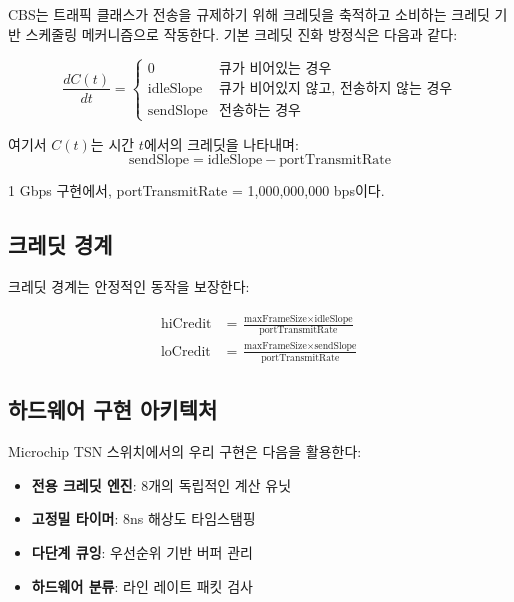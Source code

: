 \documentclass[12pt, a4paper]{article}
\begin{document}
CBS는 트래픽 클래스가 전송을 규제하기 위해 크레딧을 축적하고 소비하는 크레딧 기반 스케줄링 메커니즘으로 작동한다. 기본 크레딧 진화 방정식은 다음과 같다:

\begin{equation}
\frac{dC(t)}{dt} = \begin{cases}
0 & \text{큐가 비어있는 경우} \\
\text{idleSlope} & \text{큐가 비어있지 않고, 전송하지 않는 경우} \\
\text{sendSlope} & \text{전송하는 경우}
\end{cases}
\end{equation}

여기서 $C(t)$는 시간 $t$에서의 크레딧을 나타내며:
\begin{equation}
\text{sendSlope} = \text{idleSlope} - \text{portTransmitRate}
\end{equation}

1 Gbps 구현에서, portTransmitRate = 1,000,000,000 bps이다.

\subsection{크레딧 경계}

크레딧 경계는 안정적인 동작을 보장한다:

\begin{align}
\text{hiCredit} &= \frac{\text{maxFrameSize} \times \text{idleSlope}}{\text{portTransmitRate}} \\
\text{loCredit} &= \frac{\text{maxFrameSize} \times \text{sendSlope}}{\text{portTransmitRate}}
\end{align}

\subsection{하드웨어 구현 아키텍처}

Microchip TSN 스위치에서의 우리 구현은 다음을 활용한다:

\begin{itemize}
    \item \textbf{전용 크레딧 엔진}: 8개의 독립적인 계산 유닛
    \item \textbf{고정밀 타이머}: 8ns 해상도 타임스탬핑
    \item \textbf{다단계 큐잉}: 우선순위 기반 버퍼 관리
    \item \textbf{하드웨어 분류}: 라인 레이트 패킷 검사
\end{itemize}
\end{document}
